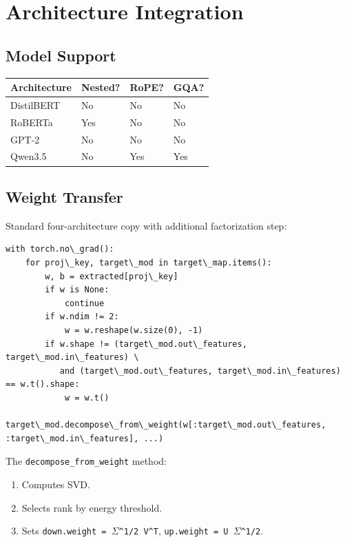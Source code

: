 
\section{Architecture Integration}

\subsection{Model Support}

\begin{table}[H]
\centering
\small
\begin{tabular}{llll}
\toprule
\textbf{Architecture} & \textbf{Nested?} & \textbf{RoPE?} & \textbf{GQA?} \\
\midrule
DistilBERT & No & No & No \\
RoBERTa & Yes & No & No \\
GPT-2 & No & No & No \\
Qwen3.5 & No & Yes & Yes \\
\bottomrule
\end{tabular}
\end{table}

\subsection{Weight Transfer}

Standard four-architecture copy with additional factorization step:

\begin{lstlisting}
with torch.no\_grad():
    for proj\_key, target\_mod in target\_map.items():
        w, b = extracted[proj\_key]
        if w is None:
            continue
        if w.ndim != 2:
            w = w.reshape(w.size(0), -1)
        if w.shape != (target\_mod.out\_features, target\_mod.in\_features) \
           and (target\_mod.out\_features, target\_mod.in\_features) == w.t().shape:
            w = w.t()
        target\_mod.decompose\_from\_weight(w[:target\_mod.out\_features, :target\_mod.in\_features], ...)
\end{lstlisting}

The \texttt{decompose\_from\_weight} method:
\begin{enumerate}
\item Computes SVD.
\item Selects rank by energy threshold.
\item Sets \texttt{down.weight = $\Sigma$^{1/2} V^T}, \texttt{up.weight = U $\Sigma$^{1/2}}.

\end{enumerate}
